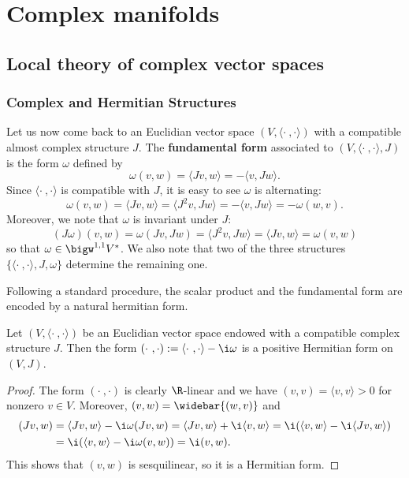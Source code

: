 \chapter{Complex manifolds}
\section{Local theory of complex vector spaces}
\subsection{Complex and Hermitian Structures}
Let us now come back to an Euclidian vector space $(V,\langle\cdot\ ,\cdot\rangle)$ with a compatible almost complex structure $J$. The \textbf{fundamental form} associated to $(V,\langle\cdot\ ,\cdot\rangle,J)$ is the form $\omega$ defined by
\[\omega(v,w)=\langle Jv,w\rangle=-\langle v,Jw\rangle.\]
Since $\langle\cdot\ ,\cdot\rangle$ is compatible with $J$, it is easy to see $\omega$ is alternating:
\[\omega(v,w)=\langle Jv,w\rangle=\langle J^2v,Jw\rangle=-\langle v,Jw\rangle=-\omega(w,v).\]
Moreover, we note that $\omega$ is invariant under $J$:
\[(J\omega)(v,w)=\omega(Jv,Jw)=\langle J^2v,Jw\rangle=\langle Jv,w\rangle=\omega(v,w)\]
so that $\omega\in\bigw^{1,1}V^*$. We also note that two of the three structures $\{\langle\cdot\ ,\cdot\rangle,J,\omega\}$ determine the remaining
one.\par
Following a standard procedure, the scalar product and the fundamental form are encoded by a natural hermitian form.
\begin{proposition}\label{almost complex space induce Hermitian}
Let $(V,\langle\cdot\ ,\cdot\rangle)$ be an Euclidian vector space endowed with a compatible complex structure $J$. Then the form $(\cdot\ ,\cdot):=\langle\cdot\ ,\cdot\rangle-\i\omega$ is a positive Hermitian form on $(V,J)$.
\end{proposition}
\begin{proof}
The form $(\cdot\ ,\cdot)$ is clearly $\R$-linear and we have $(v,v)=\langle v,v\rangle>0$ for nonzero $v\in V$. Moreover, $(v,w)=\widebar{(w,v)}$ and
\begin{align*}
(Jv,w)&=\langle Jv,w\rangle-\i\omega(Jv,w)=\langle Jv,w\rangle+\i\langle v,w\rangle=\i(\langle v,w\rangle-\i\langle Jv,w\rangle)\\
&=\i(\langle v,w\rangle-\i\omega(v,w))=\i(v,w).
\end{align*}
This shows that $(v,w)$ is sesquilinear, so it is a Hermitian form.
\end{proof}
